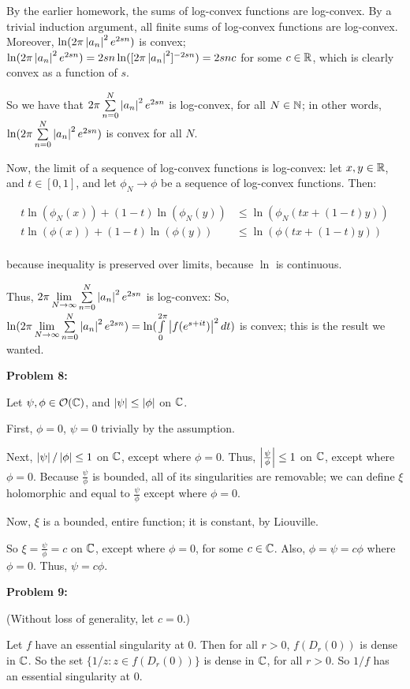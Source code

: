 \documentclass[a4paper,12pt]{article}
\begin{document}
By the earlier homework, the sums of log-convex functions are log-convex. By a trivial induction argument, all finite sums of log-convex functions are log-convex. Moreover, $\ln(2\pi \left\lvert a_n \right\rvert^2 e^{2sn})$ is convex; $\ln(2\pi \left\lvert a_n \right\rvert^2 e^{2sn}) = 2sn \ln([2\pi\left\lvert a_n \right\rvert^2]^{-2sn}) = 2snc$ for some $c \in \mathbb{R}$, which is clearly convex as a function of $s$. %

So we have that $2\pi \sum\limits_{n=0}^N \left\lvert a_n \right\rvert^2 e^{2sn}$ is log-convex, for all $N \in \mathbb{N}$; in other words, $\ln(2\pi \sum\limits_{n=0}^N \left\lvert a_n \right\rvert^2 e^{2sn})$ is convex for all $N$.

Now, the limit of a sequence of log-convex functions is log-convex: let $x,y \in \mathbb{R}$, and $t \in [0,1]$, and let $\phi_N \to \phi$ be a sequence of log-convex functions. Then:

\begin{align*}
t\ln(\phi_N(x)) + (1-t)\ln(\phi_N(y)) &\leq \ln(\phi_N(tx+(1-t)y))\\
t\ln(\phi(x)) + (1-t)\ln(\phi(y)) &\leq \ln(\phi(tx+(1-t)y))\\
\end{align*}

because inequality is preserved over limits, because $\ln$ is continuous.

Thus, $2\pi \lim\limits_{N \to \infty}\sum\limits_{n=0}^N \left\lvert a_n \right\rvert^2 e^{2sn}$ is log-convex: So, $\ln(2\pi \lim\limits_{N \to \infty}\sum\limits_{n=0}^N \left\lvert a_n \right\rvert^2 e^{2sn}) = \ln(\int\limits_0^{2\pi} \left\lvert f(e^{s+it}) \right\rvert^2 dt)$ is convex; this is the result we wanted.

\shunt

{\bf Problem 8:}

Let $\psi, \phi \in \mathcal{O}(\mathbb{C})$, and $\left\lvert \psi \right\rvert \leq \left\lvert \phi \right\rvert$ on $\mathbb{C}$.

First, $\phi = 0$, $\psi = 0$ trivially by the assumption.

Next, $\left\lvert \psi \right\rvert/\left\lvert \phi \right\rvert \leq 1$ on $\mathbb{C}$, except where $\phi = 0$. Thus, $\left\lvert \frac{\psi}{\phi} \right\rvert \leq 1$ on $\mathbb{C}$, except where $\phi = 0$. Because $\frac{\psi}{\phi}$ is bounded, all of its singularities are removable; we can define $\xi$ holomorphic and equal to $\frac{\psi}{\phi}$ except where $\phi = 0$. 

Now, $\xi$ is a bounded, entire function; it is constant, by Liouville.

So $\xi = \frac{\psi}{\phi} = c$ on $\mathbb{C}$, except where $\phi = 0$, for some $c \in \mathbb{C}$. Also, $\phi = \psi = c\phi$ where $\phi = 0$. Thus, $\psi = c \phi$.

\shunt

{\bf Problem 9:}

(Without loss of generality, let $c=0$.)

Let $f$ have an essential singularity at $0$. Then for all $r>0$, $f(D_r(0))$ is dense in $\mathbb{C}$. So the set $\{1/z: z \in f(D_r(0))\}$ is dense in $\mathbb{C}$, for all $r >0$. So $1/f$ has an essential singularity at $0$.

\shunt
\end{document}
